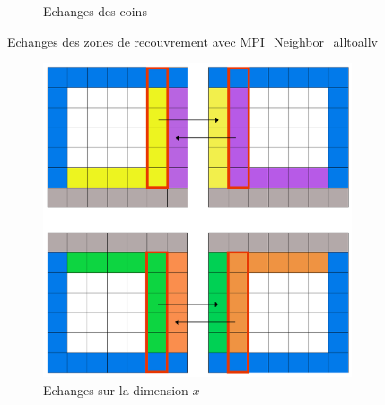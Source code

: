 \documentclass{beamer}
\begin{document}
\begin{frame}
\begin{figure}[!ht]
\begin{subfigure}[b]{0.5\textwidth}
    \caption{\label{fig:comm_diag}Echanges des coins}
  \end{subfigure}
  \caption{\label{fig:comm_neighbors}Echanges des zones de recouvrement avec MPI\_Neighbor\_alltoallv}
\end{figure}
  
\end{frame}

\begin{frame}
  \begin{figure}[!ht]
  \centering
  \begin{subfigure}[b]{0.5\textwidth}
    \centering
    \includegraphics[scale=0.12]{figures/comm1.png}
    \caption{\label{fig:comm1}Echanges sur la dimension $x$}
  \end{subfigure}%
  ~
  \begin{subfigure}[b]{0.5\textwidth}
    \centering

\end{subfigure}
\end{figure}
\end{frame}
\end{document}
